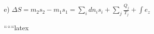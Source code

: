 e) \(\Delta S = m_2 s_2 - m_1 s_1 = \sum_i dn_i s_i + \sum_j \frac{Q_j}{T_j} + \int e_z\)

``````latex